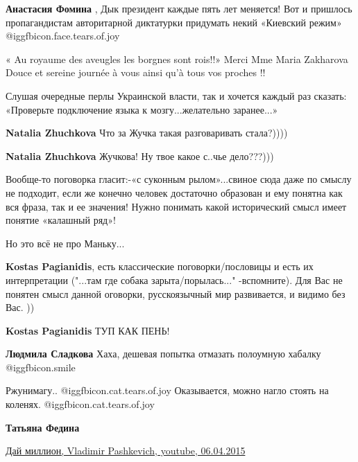 \begin{itemize}
\begin{itemize}
\textbf{Анастасия Фомина} , Дык президент каждые пять лет меняется! Вот и пришлось пропагандистам авторитарной диктатурки придумать некий «Киевский режим»  @igg{fbicon.face.tears.of.joy} 

\end{itemize} %

« Au royaume des aveugles les borgnes sont rois!!»
Merci Mme Maria Zakharova
Douce et sereine journée à vous ainsi qu’à tous vos proches !!

Слушая очередные перлы Украинской власти, так и хочется каждый раз сказать: «Проверьте подключение языка к мозгу...желательно заранее...»

\begin{itemize} %
\textbf{Natalia Zhuchkova} Что за Жучка такая разговаривать стала?))))

\textbf{Natalia Zhuchkova} Жучкова! Ну твое какое с..чье дело???)))
\end{itemize} %


Вообще-то поговорка гласит:-«с суконным рылом»...свиное сюда даже по смыслу не
подходит, если же конечно человек достаточно образован и ему понятна как вся
фраза, так и ее значения! Нужно понимать какой исторический смысл имеет понятие
«калашный ряд»!

Но это всё не про Маньку...

\begin{itemize} %
\textbf{Kostas Pagianidis}, есть классические поговорки/пословицы и есть их интерпретации ("...там где собака зарыта/порылась..." -вспомните). Для Вас не понятен смысл данной оговорки, русскоязычный мир развивается, и видимо без Вас. ))

\textbf{Kostas Pagianidis} ТУП КАК ПЕНЬ!

\textbf{Людмила Сладкова} Хаха, дешевая попытка отмазать полоумную хабалку  @igg{fbicon.smile} 
\end{itemize} %

Ржунимагу.. @igg{fbicon.cat.tears.of.joy}  Оказывается, можно нагло стоять на коленях. @igg{fbicon.cat.tears.of.joy} 

\begin{itemize} %
\textbf{Татьяна Федина} 

\href{https://www.youtube.com/watch?v=Ao_fusFlucg}{
Дай миллион, Vladimir Pashkevich, youtube, 06.04.2015%
}


\end{itemize}
\end{itemize}
